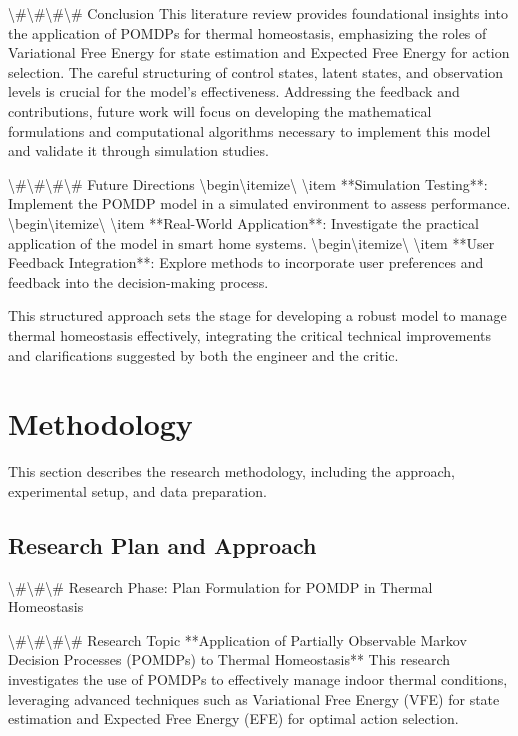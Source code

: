 \documentclass[11pt,a4paper]{article}
\begin{document}
\textbackslash{}#\textbackslash{}#\textbackslash{}#\textbackslash{}# Conclusion
This literature review provides foundational insights into the application of POMDPs for thermal homeostasis, emphasizing the roles of Variational Free Energy for state estimation and Expected Free Energy for action selection. The careful structuring of control states, latent states, and observation levels is crucial for the model's effectiveness. Addressing the feedback and contributions, future work will focus on developing the mathematical formulations and computational algorithms necessary to implement this model and validate it through simulation studies.

\textbackslash{}#\textbackslash{}#\textbackslash{}#\textbackslash{}# Future Directions
\textbackslash{}begin\textbackslash{}{itemize\textbackslash{}}
\textbackslash{}item **Simulation Testing**: Implement the POMDP model in a simulated environment to assess performance.
\textbackslash{}begin\textbackslash{}{itemize\textbackslash{}}
\textbackslash{}item **Real-World Application**: Investigate the practical application of the model in smart home systems.
\textbackslash{}begin\textbackslash{}{itemize\textbackslash{}}
\textbackslash{}item **User Feedback Integration**: Explore methods to incorporate user preferences and feedback into the decision-making process.

This structured approach sets the stage for developing a robust model to manage thermal homeostasis effectively, integrating the critical technical improvements and clarifications suggested by both the engineer and the critic.
\section{Methodology}

This section describes the research methodology, including the approach, experimental setup, and data preparation.


\subsection{Research Plan and Approach}

\textbackslash{}#\textbackslash{}#\textbackslash{}# Research Phase: Plan Formulation for POMDP in Thermal Homeostasis

\textbackslash{}#\textbackslash{}#\textbackslash{}#\textbackslash{}# Research Topic
**Application of Partially Observable Markov Decision Processes (POMDPs) to Thermal Homeostasis**  
This research investigates the use of POMDPs to effectively manage indoor thermal conditions, leveraging advanced techniques such as Variational Free Energy (VFE) for state estimation and Expected Free Energy (EFE) for optimal action selection.
\end{document}
